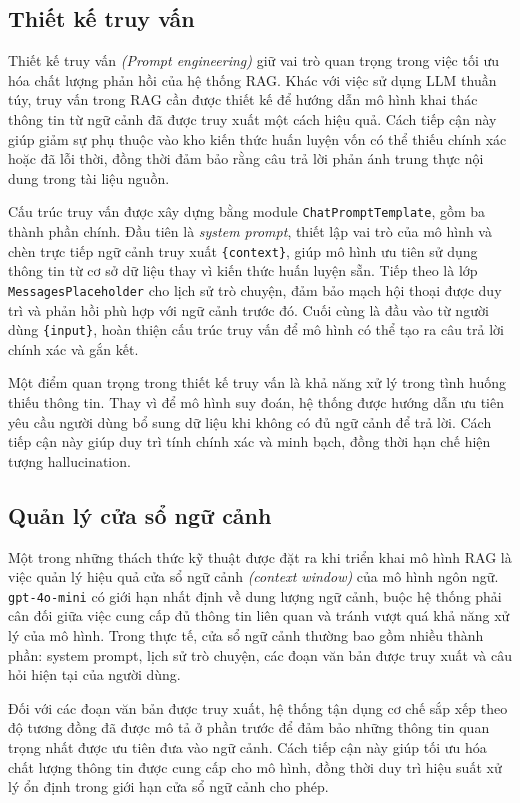 \subsection{Thiết kế truy vấn}

Thiết kế truy vấn \emph{(Prompt engineering)} giữ vai trò quan trọng trong việc tối ưu hóa chất lượng phản hồi của hệ thống RAG. Khác với việc sử dụng LLM thuần túy, truy vấn trong RAG cần được thiết kế để hướng dẫn mô hình khai thác thông tin từ ngữ cảnh đã được truy xuất một cách hiệu quả. Cách tiếp cận này giúp giảm sự phụ thuộc vào kho kiến thức huấn luyện vốn có thể thiếu chính xác hoặc đã lỗi thời, đồng thời đảm bảo rằng câu trả lời phản ánh trung thực nội dung trong tài liệu nguồn.

Cấu trúc truy vấn được xây dựng bằng module \texttt{ChatPromptTemplate}, gồm ba thành phần chính. Đầu tiên là \emph{system prompt}, thiết lập vai trò của mô hình và chèn trực tiếp ngữ cảnh truy xuất \texttt{\{context\}}, giúp mô hình ưu tiên sử dụng thông tin từ cơ sở dữ liệu thay vì kiến thức huấn luyện sẵn. Tiếp theo là lớp \texttt{MessagesPlaceholder} cho lịch sử trò chuyện, đảm bảo mạch hội thoại được duy trì và phản hồi phù hợp với ngữ cảnh trước đó. Cuối cùng là đầu vào từ người dùng \texttt{\{input\}}, hoàn thiện cấu trúc truy vấn để mô hình có thể tạo ra câu trả lời chính xác và gắn kết.

Một điểm quan trọng trong thiết kế truy vấn là khả năng xử lý trong tình huống thiếu thông tin. Thay vì để mô hình suy đoán, hệ thống được hướng dẫn ưu tiên yêu cầu người dùng bổ sung dữ liệu khi không có đủ ngữ cảnh để trả lời. Cách tiếp cận này giúp duy trì tính chính xác và minh bạch, đồng thời hạn chế hiện tượng hallucination.

\subsection{Quản lý cửa sổ ngữ cảnh}

Một trong những thách thức kỹ thuật được đặt ra khi triển khai mô hình RAG là việc quản lý hiệu quả cửa sổ ngữ cảnh \emph{(context window)} của mô hình ngôn ngữ. \texttt{gpt-4o-mini} có giới hạn nhất định về dung lượng ngữ cảnh, buộc hệ thống phải cân đối giữa việc cung cấp đủ thông tin liên quan và tránh vượt quá khả năng xử lý của mô hình. Trong thực tế, cửa sổ ngữ cảnh thường bao gồm nhiều thành phần: system prompt, lịch sử trò chuyện, các đoạn văn bản được truy xuất và câu hỏi hiện tại của người dùng.

Đối với các đoạn văn bản được truy xuất, hệ thống tận dụng cơ chế sắp xếp theo độ tương đồng đã được mô tả ở phần trước để đảm bảo những thông tin quan trọng nhất được ưu tiên đưa vào ngữ cảnh. Cách tiếp cận này giúp tối ưu hóa chất lượng thông tin được cung cấp cho mô hình, đồng thời duy trì hiệu suất xử lý ổn định trong giới hạn cửa sổ ngữ cảnh cho phép.

